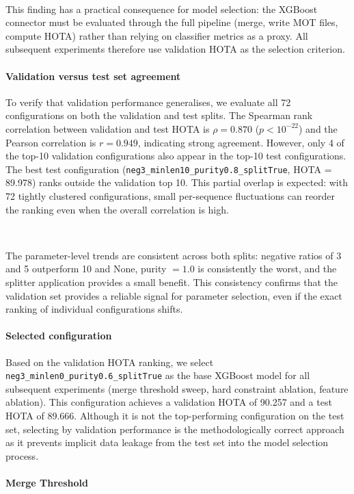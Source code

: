\

This finding has a practical consequence for model selection: the XGBoost connector must be evaluated through the full pipeline (merge, write MOT files, compute HOTA) rather than relying on classifier metrics as a proxy. All subsequent experiments therefore use validation HOTA as the selection criterion.


\paragraph{Validation versus test set agreement}
To verify that validation performance generalises, we evaluate all 72 configurations on both the validation and test splits. The Spearman rank correlation between validation and test HOTA is $\rho = 0.870$ ($p < 10^{-22}$) and the Pearson correlation is $r = 0.949$, indicating strong agreement. However, only 4 of the top-10 validation configurations also appear in the top-10 test configurations. The best test configuration (\texttt{neg3\_minlen10\_purity0.8\_splitTrue}, HOTA = 89.978) ranks outside the validation top 10. This partial overlap is expected: with 72 tightly clustered configurations, small per-sequence fluctuations can reorder the ranking even when the overall correlation is high.

\

The parameter-level trends are consistent across both splits: negative ratios of 3 and 5 outperform 10 and None, purity $= 1.0$ is consistently the worst, and the splitter application provides a small benefit. This consistency confirms that the validation set provides a reliable signal for parameter selection, even if the exact ranking of individual configurations shifts.


\paragraph{Selected configuration}
Based on the validation HOTA ranking, we select \texttt{neg3\_minlen0\_purity0.6\_splitTrue} as the base XGBoost model for all subsequent experiments (merge threshold sweep, hard constraint ablation, feature ablation). This configuration achieves a validation HOTA of 90.257 and a test HOTA of 89.666. Although it is not the top-performing configuration on the test set, selecting by validation performance is the methodologically correct approach as it prevents implicit data leakage from the test set into the model selection process.


\paragraph{Merge Threshold}\label{par:merge_threshold}


